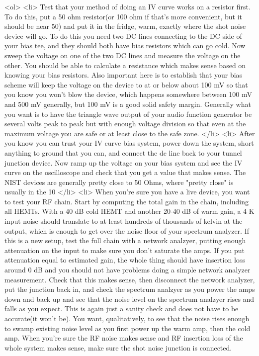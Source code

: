 \documentclass[11pt]{article}
\begin{document}
<ol>
    <li>
        Test that your method of doing an IV curve works on a resistor first.  To do this, put a 50 ohm resistor(or 100 ohm if that's more convenient, but it should be near 50) and put it in the fridge, warm, exactly where the shot noise device will go.  To do this you need two DC lines connecting to the DC side of your bias tee, and they should both have bias resistors which can go cold.  Now sweep the voltage on one of the two DC lines and measure the voltage on the other.  You should be able to calculate a resistance which makes sense based on knowing your bias resistors.  Also important here is to establish that your bias scheme will keep the voltage on the device to at or below about 100 mV so that you know you won't blow the device, which happens somewhere between 100 mV and 500 mV generally, but 100 mV is a good solid safety margin.  Generally what you want is to have the triangle wave output of your audio function generator be several volts peak to peak but with enough voltage division so that even at the maximum voltage you are safe or at least close to the safe zone.
    </li>
    <li>
        After you know you can trust your IV curve bias system, power down the system, short anything to ground that you can, and connect the dc line back to your tunnel junction device.  Now ramp up the voltage on your bias system and see the IV curve on the oscilloscope and check that you get a value that makes sense.  The NIST devices are generally pretty close to 50 Ohms, where "pretty close" is usually in the 10%
    </li>
    <li>
        When you're sure you have a live device, you want to test your RF chain.  Start by computing the total gain in the chain, including all HEMTs.  With a 40 dB cold HEMT and another 20-40 dB of warm gain, a 4 K input noise should translate to at least hundreds of thousands of kelvin at the output, which is enough to get over the noise floor of your spectrum analyzer.  If this is a new setup, test the full chain with a network analzyer, putting enough attenuation on the input to make sure you don't saturate the amps.  If you put attenuation equal to estimated gain, the whole thing should have insertion loss around 0 dB and you should not have problems doing a simple network analyzer measurement.  Check that this makes sense, then disconnect the network analyzer, put the junction back in, and check the spectrum analzyer as you power the amps down and back up and see that the noise level on the spectrum analzyer rises and falls as you expect.  This is again just a sanity check and does not have to be accurate(it won't be).  You want, qualitatively, to see that the noise rises enough to swamp existing noise level as you first power up the warm amp, then the cold amp.  When you're sure the RF noise makes sense and RF insertion loss of the whole system makes sense, make sure the shot noise junction is connected.
\end{document}

